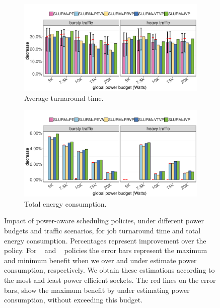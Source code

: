\begin{figure}[ht!]
	\centering
  \begin{subfigure}[b]{.9\textwidth}
    \includegraphics[width=\textwidth]{power_aware_job_scheduling/figures/average_turnaround_time_115W}
    \caption{Average turnaround time.}
    \label{fig:avg_turnaround_time_115W}
  \end{subfigure}%

	\begin{subfigure}[b]{.9\textwidth}
  	\includegraphics[width=\textwidth]{power_aware_job_scheduling/figures/total_energy_115W}
		\caption{Total energy consumption.}
    \label{fig:total_energy_115W}
  \end{subfigure}%

	\caption{	Impact of power-aware scheduling policies, under different power budgets and traffic scenarios, for job turnaround time and total energy consumption.
						Percentages represent improvement over the \DefaultSched~ policy.  For \PESched~ and \PEVASched~ policies the error bars represent the maximum and minimum benefit when we over and under estimate 
						power consumption, respectively.  We obtain these estimations according to the most and least power efficient sockets.  The red lines on the error bars, show the maximum benefit by 
						under estimating power consumption, without exceeding this budget.}
	\label{fig:policy_comparison}
	\vspace{.5cm}
\end{figure}



